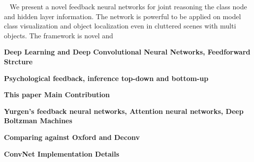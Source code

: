 ~\cite{a}
We present a novel feedback neural networks for joint reasoning the class node and hidden layer information. The network is powerful to be applied on model class visualization and object localization even in cluttered scenes with multi objects. The framework is novel and 

\textbf{Deep Learning and Deep Convolutional Neural Networks, Feedforward Strcture}

\textbf{Psychological feedback, inference top-down and bottom-up}

\textbf{This paper Main Contribution}

\textbf{Yurgen's feedback neural networks, Attention neural networks, Deep Boltzman Machines}

\textbf{Comparing against Oxford and Deconv}

\textbf{ConvNet Implementation Details}
